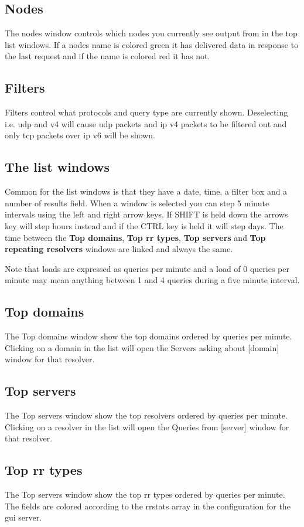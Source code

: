 \documentclass[a4paper]{article}
\begin{document}
\subsection{Nodes}
The nodes window controls which nodes you currently see output 
from in the top list windows.
If a nodes name is colored green it has delivered data in response 
to the last request and if the name is colored red it has not.

\subsection{Filters}
Filters control what protocols and query type are currently shown. Deselecting i.e. 
udp and v4 will cause udp packets and ip v4 packets to be filtered out 
and only tcp packets over ip v6 will be shown.

\subsection{The list windows}
Common for the list windows is that they have a date, time, a filter box and a 
number of results field.
When a window is selected you can step 5 minute intervals using the left and 
right arrow keys. If SHIFT is held down the arrows key will step hours instead 
and if the CTRL key is held it will step days.
The time between the \textbf{Top domains}, \textbf{Top rr types}, 
\textbf{Top servers} and \textbf{Top repeating resolvers} windows are 
linked and always the same.

Note that loads are expressed as queries per minute and a load of 0 queries per 
minute may mean anything between 1 and 4 queries during a five minute interval.


\subsection{Top domains}
The Top domains window show the top domains ordered by queries per minute. 
Clicking on a domain in the list will open the Servers asking about [domain] 
window for that resolver.

\subsection{Top servers}
The Top servers window show the top resolvers ordered by queries per minute. 
Clicking on a resolver in the list will open the Queries from [server] window 
for that resolver.
\subsection{Top rr types}
The Top servers window show the top rr types ordered by queries per minute. 
The fields are colored according to the rrstats array in the configuration 
for the gui server. 
\end{document}
